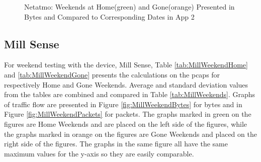 \begin{figure}[H]
\begin{subfigure}[b]{0.47\textwidth}
    \end{subfigure}
   \begin{subfigure}[b]{0.47\textwidth}
    \end{subfigure}
    \begin{subfigure}[b]{0.47\textwidth}
    \end{subfigure}
    \begin{subfigure}[b]{0.47\textwidth}
    \end{subfigure}
    \hspace{0.6cm}
    \begin{subfigure}[b]{0.47\textwidth}
    \end{subfigure}
    \caption{Netatmo: Weekends at Home(green) and Gone(orange) Presented in Bytes and Compared to Corresponding Dates in App 2}
    \label{fig:NetatmoWeekendBytesandApp2}
\end{figure}

\subsection{Mill Sense}
For weekend testing with the device, Mill Sense, Table \ref{tab:MillWeekendHome} and \ref{tab:MillWeekendGone} presents the calculations on the pcaps for respectively Home and Gone Weekends. Average and standard deviation values from the tables are combined and compared in Table \ref{tab:MillWeekends}. Graphs of traffic flow are presented in Figure \ref{fig:MillWeekendBytes} for bytes and in Figure \ref{fig:MillWeekendPackets} for packets. The graphs marked in green on the figures are Home Weekends and are placed on the left side of the figures, while the graphs marked in orange on the figures are Gone Weekends and placed on the right side of the figures. The graphs in the same figure all have the same maximum values for the y-axis so they are easily comparable.

